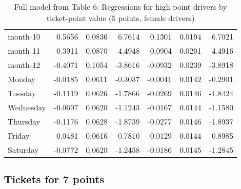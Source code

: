 \documentclass[10pt]{article}
\begin{document}
\begin{table}[ht]
\begin{tabular}{lrrrrrr}
  month-10 & 0.5656 & 0.0836 & 6.7614 & 0.1301 & 0.0194 & 6.7021 \\ 
  month-11 & 0.3911 & 0.0870 & 4.4948 & 0.0904 & 0.0201 & 4.4916 \\ 
  month-12 & -0.4071 & 0.1054 & -3.8616 & -0.0932 & 0.0239 & -3.8918 \\ 
  Monday & -0.0185 & 0.0611 & -0.3037 & -0.0041 & 0.0142 & -0.2901 \\ 
  Tuesday & -0.1119 & 0.0626 & -1.7866 & -0.0269 & 0.0146 & -1.8424 \\ 
  Wednesday & -0.0697 & 0.0620 & -1.1243 & -0.0167 & 0.0144 & -1.1580 \\ 
  Thursday & -0.1176 & 0.0628 & -1.8739 & -0.0277 & 0.0146 & -1.8937 \\ 
  Friday & -0.0481 & 0.0616 & -0.7810 & -0.0129 & 0.0144 & -0.8985 \\ 
  Saturday & -0.0772 & 0.0620 & -1.2438 & -0.0186 & 0.0145 & -1.2845 \\ 
   \hline
\end{tabular}
\caption{Full model from Table 6: Regressions for high-point drivers by ticket-point value (5 points, female drivers)} 
\label{tab_6_5_pts_no_age_F}
\end{table}


\clearpage
\pagebreak




\subsection{Tickets for 7 points}



\end{document}
